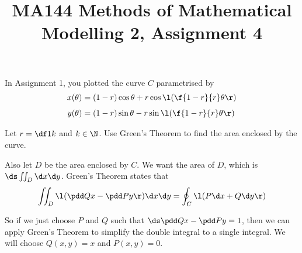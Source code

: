 \documentclass[a4paper]{article}
\title{MA144 Methods of Mathematical Modelling 2, Assignment 4}
\begin{document}
\maketitle

\setlength{\parindent}{0em}
\setlength{\parskip}{1em}


\begin{questionbody}
In Assignment 1, you plotted the curve $C$ parametrised by \begin{align*}
x(\theta) &= (1-r) \cos \theta + r \cos \l( \f{1-r}{r} \theta \r) \\[1ex]
y(\theta) &= (1-r) \sin \theta - r \sin \l( \f{1-r}{r} \theta \r)
\end{align*}

Let $r = \df1k$ and $k \in \N$. Use Green's Theorem to find the area enclosed by the curve.
\end{questionbody}

Also let $D$ be the area enclosed by $C$. We want the area of $D$, which is $\ds \iint_D \d x \d y$. Green's Theorem states that \[ \iint_D \l( \pdd Qx - \pdd Py \r) \d x \d y = \oint_C \l( P \d x + Q \d y \r) \]

So if we just choose $P$ and $Q$ such that $\ds \pdd Qx - \pdd Py = 1$, then we can apply Green's Theorem to simplify the double integral to a single integral. We will choose $Q(x, y) = x$ and $P(x, y) = 0$.
\end{document}
